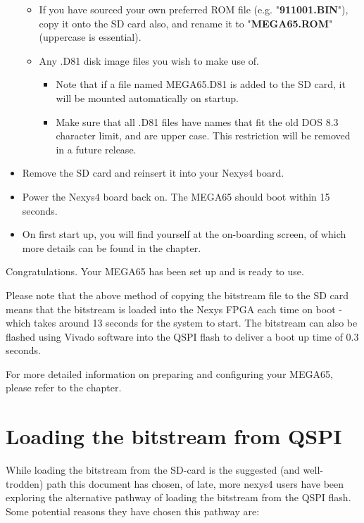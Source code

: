 \begin{itemize}
\begin{itemize}
    \item{If you have sourced your own preferred ROM file} (e.g. "\textbf{911001.BIN}"), copy it onto the SD card also, and rename it to "\textbf{MEGA65.ROM}" (uppercase is essential).
    \item{Any .D81 disk image files} you wish to make use of.
      \begin{itemize}
        \item Note that if a file named MEGA65.D81 is added to the SD card, it will be mounted automatically on startup.
        \item Make sure that all .D81 files have names that fit the old DOS 8.3 character limit, and are upper case.  This restriction will be removed in a future release.
      \end{itemize}
  \end{itemize}
\item{Remove the SD card} and reinsert it into your Nexys4 board.
\item{Power the Nexys4} board back on.  The MEGA65 should boot within 15 seconds.
\item On first start up, you will find yourself at the on-boarding screen, of which more details can be found in the  chapter.

\end{itemize}

Congratulations. Your MEGA65 has been set up and is ready to use.

Please note that the above method of copying the bitstream file to the SD card means that the bitstream is loaded into the Nexys FPGA each time on boot - which takes around 13 seconds for the system to start. The bitstream can also be flashed using Vivado software into the QSPI flash to deliver a boot up time of 0.3 seconds. 

For more detailed information on preparing and configuring your MEGA65, please refer to the  chapter. 

\section{Loading the bitstream from QSPI}

While loading the bitstream from the SD-card is the suggested (and well-trodden) path this document has chosen, of late, more nexys4 users have been exploring the alternative pathway of loading the bitstream from the QSPI flash. Some potential reasons they have chosen this pathway are:

